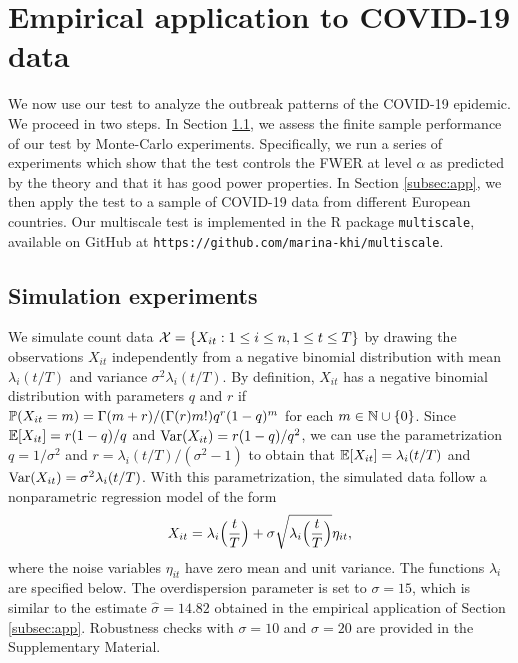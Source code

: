 \documentclass[a4paper,12pt]{article}
\numberwithin{equation}{section}
\begin{document}
\section{Empirical application to COVID-19 data}\label{sec:empirics} 


We now use our test to analyze the outbreak patterns of the COVID-19 epidemic. We proceed in two steps. In Section \ref{subsec:sim}, we assess the finite sample performance of our test by Monte-Carlo experiments. Specifically, we run a series of experiments which show that the test controls the FWER at level $\alpha$ as predicted by the theory and that it has good power properties. In Section \ref{subsec:app}, we then apply the test to a sample of COVID-19 data from different European countries. Our multiscale test is implemented in the R package \verb|multiscale|, available on GitHub at \texttt{https://github.com/marina-khi/multiscale}.


\subsection{Simulation experiments}\label{subsec:sim}


We simulate count data $\mathcal{X} = \{ X_{it}: 1 \le i \le n, 1 \le t \le T \}$ by drawing the observations $X_{it}$ independently from a negative binomial distribution with mean $\lambda_i(t/T)$ and variance $\sigma^2 \lambda_i(t/T)$. By definition, $X_{it}$ has a negative binomial distribution with para\-meters $q$ and $r$ if $\mathbb{P}(X_{it} = m) = \Gamma(m+r) / (\Gamma(r) m!) q^r (1-q)^m$ for each $m \in \mathbb{N} \cup \{0\}$. Since $\mathbb{E}[X_{it}] = r (1-q)/q$ and $\textnormal{Var}(X_{it}) = r(1-q)/q^2$, we can use the parametrization $q = 1/\sigma^2$ and $r = \lambda_i(t/T) / (\sigma^2 - 1)$ to obtain that $\mathbb{E}[X_{it}] = \lambda_i(t/T)$ and $\textnormal{Var}(X_{it}) = \sigma^2 \lambda_i(t/T)$. With this parametrization, the simulated data follow a nonparametric regression model of the form 
\[ X_{it} = \lambda_i\Big(\frac{t}{T}\Big) + \sigma \sqrt{\lambda_i\Big(\frac{t}{T}\Big)} \eta_{it}, \]
where the noise variables $\eta_{it}$ have zero mean and unit variance. The functions $\lambda_i$ are specified below. The overdispersion parameter is set to $\sigma = 15$, which is similar to the estimate $\hat{\sigma} = 14.82$ obtained in the empirical application of Section \ref{subsec:app}. Robustness checks with $\sigma=10$ and $\sigma=20$ are provided in the Supplementary Material.
\end{document}
